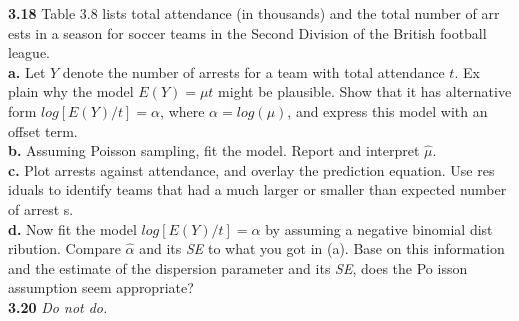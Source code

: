 \documentclass[paper=letter, fontsize=11pt]{scrartcl} %
\begin{document}
\textbf{3.18} Table 3.8 lists total attendance (in thousands) and the total number of arr
ests in a season for soccer teams in the Second Division of the British football league.
\\
\textbf{a.} Let $Y$ denote the number of arrests for a team with total attendance $t$. Ex
plain why the model $E(Y) = \mu t$ might be plausible. Show that it has alternative form 
$log[E(Y)/t] = \alpha$, where $\alpha = log(\mu)$, and express this model with an offset 
term. \\
\textbf{b.} Assuming Poisson sampling, fit the model. Report and interpret $\hat{\mu}$.\\
\textbf{c.} Plot arrests against attendance, and overlay the prediction equation. Use res
iduals to identify teams that had a much larger or smaller than expected number of arrest
s. \\
\textbf{d.} Now fit the model $log[E(Y)/t] = \alpha$ by assuming a negative binomial dist
ribution. Compare $\hat{\alpha}$ and its \textit{SE} to what you got in (a). Base on this 
information and the estimate of the dispersion parameter and its \textit{SE}, does the Po
isson assumption seem appropriate? \\

\textbf{3.20} \textit{Do not do.}
\end{document}
